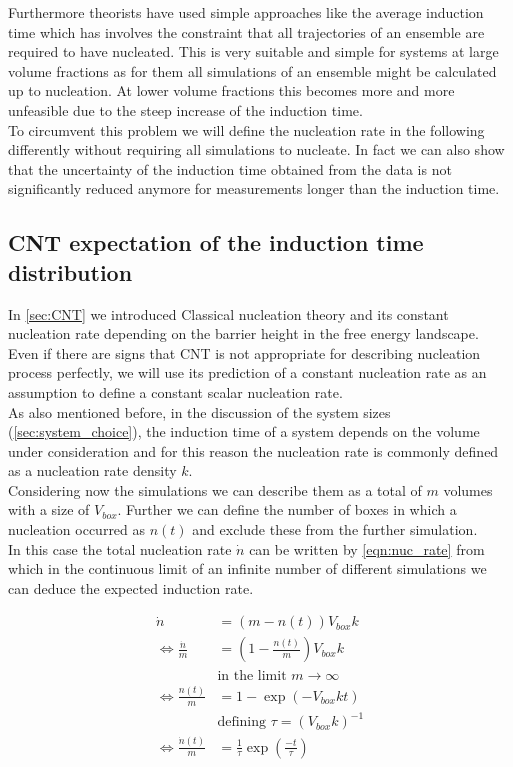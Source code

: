 Furthermore theorists have used simple approaches like the average induction time which has involves the constraint that all trajectories of an ensemble are required to have nucleated. This is very suitable and simple for systems at large volume fractions as for them all simulations of an ensemble might be calculated up to nucleation. At lower volume fractions this becomes more and more unfeasible due to the steep increase of the induction time.\\

To circumvent this problem we will define the nucleation rate in the following differently without requiring all simulations to nucleate. In fact we can also show that the uncertainty of the induction time obtained from the data is not significantly reduced anymore for measurements longer than the induction time.\\     

\subsection{CNT expectation of the induction time distribution}
\label{sec:induction_time_expectation}
In \autoref{sec:CNT} we introduced Classical nucleation theory and its constant nucleation rate depending on the barrier height in the free energy landscape. Even if there are signs that CNT is not appropriate for describing nucleation process perfectly, we will use its prediction of a constant nucleation rate as an assumption to define a constant scalar nucleation rate.\\

As also mentioned before, in the discussion of the system sizes (\autoref{sec:system_choice}), the induction time of a system depends on the volume under consideration and for this reason the nucleation rate is commonly defined as a nucleation rate density $k$.\\ 
Considering now the simulations we can describe them as a total of $m$ volumes with a size of $V_{box}$.  Further we can define the number of boxes in which a nucleation occurred as $n(t)$ and exclude these from the further simulation.\\

In this case the total nucleation rate $ \dot{n} $ can be written by \autoref{eqn:nuc_rate} from which in the continuous limit of an infinite number of different simulations we can deduce the expected induction rate.

\begin{align}
\label{eqn:nuc_rate}
\dot{n} &= (m - n(t))V_{box}k\\
\Leftrightarrow \frac{\dot{n}}{m} &= (1 - \frac{n(t)}{m})V_{box}k\\
 &  \text{in the limit } m \rightarrow \infty \nonumber\\
\Leftrightarrow \frac{n(t)}{m} &= 1 - \exp\left( -V_{box} k t \right)\\
 &  \text{defining } \tau = (V_{box} k)^{-1} \nonumber\\
\label{eqn:nuc_rate_result}
\Leftrightarrow \frac{\dot{n}(t)}{m} &= \frac{1}{\tau} \exp\left( \frac{-t}{\tau} \right) 
\end{align}


